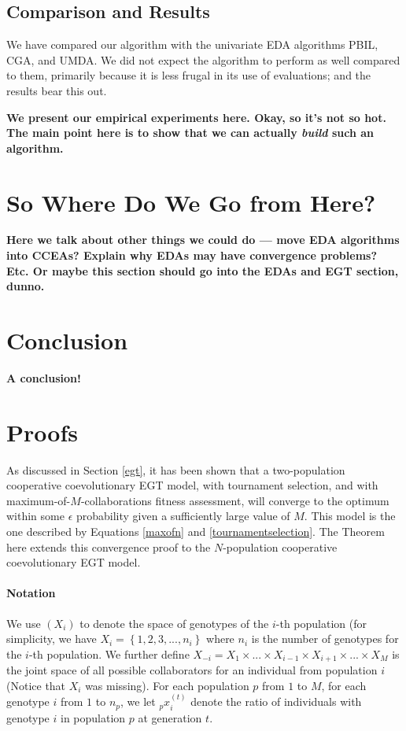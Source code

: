 \documentclass{acm_proc_article-sp}
\begin{document}
\subsection{Comparison and Results}

We have compared our algorithm with the univariate EDA algorithms PBIL, CGA, and UMDA.  We did not expect the algorithm to perform as well compared to them, primarily because it is less frugal in its use of evaluations; and the results bear this out. 

{\bf We present our empirical experiments here.  Okay, so it's not so hot.  The main point here is to show that we can actually {\it build} such an algorithm.}

\section{So Where Do We Go from Here?}

{\bf Here we talk about other things we could do --- move EDA algorithms into CCEAs?   Explain why EDAs may have convergence problems?  Etc.  Or maybe this section should go into the EDAs and EGT section, dunno.}

\section{Conclusion}

{\bf A conclusion!}


\section{Proofs}
\label{proofs}

As discussed in Section \ref{egt}, it has been shown that a two-population cooperative coevolutionary EGT model, with tournament selection, and with maximum-of-\(M\)-collaborations fitness assessment, will converge to the optimum within some \(\epsilon\) probability given a sufficiently large value of \(M\).  This model is the one described by Equations \ref{maxofn} and \ref{tournamentselection}.  The Theorem here extends this convergence proof to the \(N\)-population cooperative coevolutionary EGT model.

\paragraph{Notation} We use $\left( X_i \right)$ to denote the space of genotypes of the $i$-th population (for simplicity, we have $X_i = \left\{1, 2, 3, ..., n_i \right\}$ where $n_i$ is the number of genotypes for the $i$-th population.  We  further define $X_{-i} = X_1 \times  ... \times X_{i-1} \times X_{i+1} \times ... \times X_M$ is the joint space of all possible collaborators for an individual from population $i$ (Notice that \(X_i\) was missing).  For each population $p$ from $1$ to $M$, for each genotype $i$ from $1$ to $n_p$, we let ${_p}x^{(t)}_i$ denote the ratio of individuals with genotype $i$ in population $p$ at generation $t$.  
\end{document}
